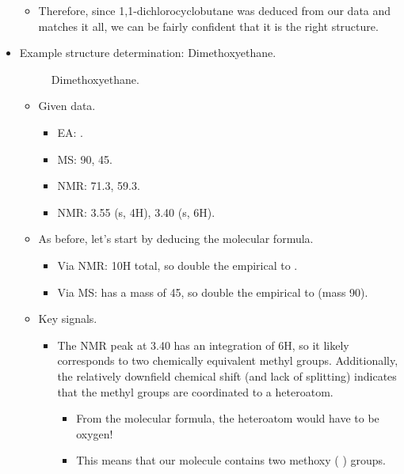 \documentclass[../notes.tex]{subfiles}
\begin{document}
\begin{itemize}
\begin{itemize}
\begin{itemize}
        \end{itemize}
        \item Therefore, since 1,1-dichlorocyclobutane was deduced from our data and matches it all, we can be fairly confident that it is the right structure.
    \end{itemize}
    \pagebreak
    \item Example structure determination: Dimethoxyethane.
    \begin{figure}[h!]
        \centering
        \footnotesize
        \caption{Dimethoxyethane.}
        \label{fig:DME}
    \end{figure}
    \begin{itemize}
        \item Given data.
        \begin{itemize}
            \item EA: .
            \item MS: 90, 45.
            \item {} NMR: 71.3, 59.3.
            \item {} NMR: 3.55 (s, 4H), 3.40 (s, 6H).
        \end{itemize}
        \item As before, let's start by deducing the molecular formula.
        \begin{itemize}
            \item Via  NMR: 10H total, so double the empirical to .
            \item Via MS:  has a mass of 45, so double the empirical to  (mass 90).
        \end{itemize}
        \item Key signals.
        \begin{itemize}
            \item The  NMR peak at \SI{3.40}{\partspermillion} has an integration of 6H, so it likely corresponds to two chemically equivalent methyl groups. Additionally, the relatively downfield chemical shift (and lack of splitting) indicates that the methyl groups are coordinated to a heteroatom.
            \begin{itemize}
                \item From the molecular formula, the heteroatom would have to be oxygen!
                \item This means that our molecule contains two methoxy (\,{\tiny{}}\,) groups.

\end{itemize}
\end{itemize}
\end{itemize}
\end{itemize}
\end{document}
